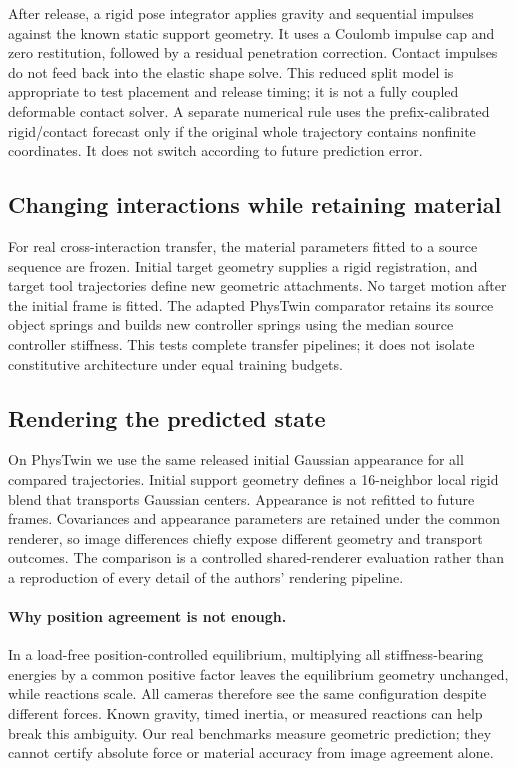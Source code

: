 \documentclass[10pt,twocolumn,letterpaper]{article}
\begin{document}
After release, a rigid pose integrator applies gravity and sequential impulses against the known static support geometry. It uses a Coulomb impulse cap and zero restitution, followed by a residual penetration correction. Contact impulses do not feed back into the elastic shape solve. This reduced split model is appropriate to test placement and release timing; it is not a fully coupled deformable contact solver. A separate numerical rule uses the prefix-calibrated rigid/contact forecast only if the original whole trajectory contains nonfinite coordinates. It does not switch according to future prediction error.

\subsection{Changing interactions while retaining material}
For real cross-interaction transfer, the material parameters fitted to a source sequence are frozen. Initial target geometry supplies a rigid registration, and target tool trajectories define new geometric attachments. No target motion after the initial frame is fitted. The adapted PhysTwin comparator retains its source object springs and builds new controller springs using the median source controller stiffness. This tests complete transfer pipelines; it does not isolate constitutive architecture under equal training budgets.

\subsection{Rendering the predicted state}
On PhysTwin we use the same released initial Gaussian appearance for all compared trajectories. Initial support geometry defines a 16-neighbor local rigid blend that transports Gaussian centers. Appearance is not refitted to future frames. Covariances and appearance parameters are retained under the common renderer, so image differences chiefly expose different geometry and transport outcomes. The comparison is a controlled shared-renderer evaluation rather than a reproduction of every detail of the authors' rendering pipeline.

\paragraph{Why position agreement is not enough.}
In a load-free position-controlled equilibrium, multiplying all stiffness-bearing energies by a common positive factor leaves the equilibrium geometry unchanged, while reactions scale. All cameras therefore see the same configuration despite different forces. Known gravity, timed inertia, or measured reactions can help break this ambiguity. Our real benchmarks measure geometric prediction; they cannot certify absolute force or material accuracy from image agreement alone.
\end{document}
